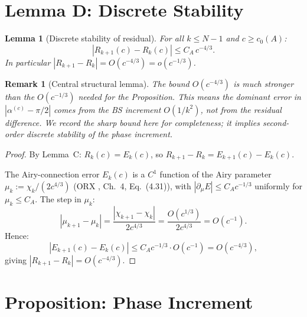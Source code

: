 \documentclass[12pt]{amsart}
\newtheorem{lemma}[theorem]{Lemma}
\newtheorem{remark}[theorem]{Remark}
\begin{document}
\section{Lemma D: Discrete Stability}
\label{sec:lemmaD}

\begin{lemma}[Discrete stability of residual]
\label{lem:D}
For all $k \le N-1$ and $c \ge c_0(A)$:
\begin{equation}\label{eq:R-diff}
  |R_{k+1}(c) - R_k(c)| \le C_A\,c^{-4/3}.
\end{equation}
In particular $|R_{k+1} - R_k| = O(c^{-4/3}) = o(c^{-1/3})$.
\end{lemma}

\begin{remark}[Central structural lemma]
The bound $O(c^{-4/3})$ is \emph{much stronger} than the
$O(c^{-1/3})$ needed for the Proposition.
This means the dominant error in $|\alpha^{(c)} - \pi/2|$
comes from the BS increment $O(1/k^2)$,
not from the residual difference.
We record the sharp bound here for completeness;
it implies \emph{second-order discrete stability} of the
phase increment.
\end{remark}

\begin{proof}
By Lemma~C: $R_k(c) = E_k(c)$,
so $R_{k+1} - R_k = E_{k+1}(c) - E_k(c)$.

The Airy-connection error $E_k(c)$ is a $C^1$ function of the
Airy parameter $\mu_k := \chi_k/(2c^{4/3})$
(ORX \cite{OsipovRokhlinXiao}, Ch.~4, Eq.~(4.31)),
with $|\partial_\mu E| \le C_A c^{-1/3}$ uniformly
for $\mu_k \le C_A$.
The step in $\mu_k$:
\[
  |\mu_{k+1} - \mu_k|
  = \frac{|\chi_{k+1} - \chi_k|}{2c^{4/3}}
  = \frac{O(c^{1/3})}{2c^{4/3}}
  = O(c^{-1}).
\]
Hence:
\begin{equation}\label{eq:E-diff}
  |E_{k+1}(c) - E_k(c)|
  \le C_A c^{-1/3} \cdot O(c^{-1})
  = O(c^{-4/3}),
\end{equation}
giving $|R_{k+1} - R_k| = O(c^{-4/3})$.
\end{proof}

\section{Proposition: Phase Increment}
\label{sec:prop}
\end{document}
